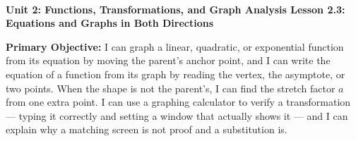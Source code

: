\documentclass[10pt]{article}
\newcommand{\UnitNumberName}{Unit 2: Functions, Transformations, and Graph Analysis \quad}
\newcommand{\LessonNumberName}{Lesson 2.3: Equations and Graphs in Both Directions}
\begin{document}
\begin{center}
    {\Large\bfseries \CourseName \\
    {\small\bfseries \UnitNumberName \LessonNumberName}}
\end{center}

\begin{tcolorbox}[colback=mist, colframe=royal, boxrule=0.9pt, arc=2mm,
    left=2mm, right=2mm, top=1.5mm, bottom=1.5mm]
    \textbf{Primary Objective:} I can graph a linear, quadratic, or exponential function from its
    equation by moving the parent's anchor point, and I can write the equation of a function from its
    graph by reading the vertex, the asymptote, or two points. When the shape is not the parent's, I
    can find the stretch factor $a$ from one extra point. I can use a graphing calculator to verify a
    transformation --- typing it correctly and setting a window that actually shows it --- and I can
    explain why a matching screen is not proof and a substitution is.
\end{tcolorbox}
\end{document}
